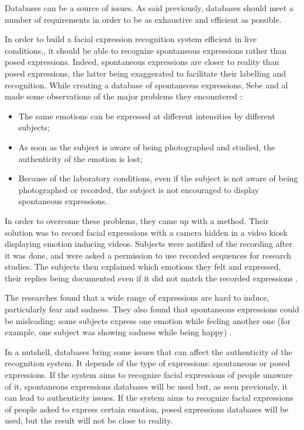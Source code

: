 \vspace{\baselineskip}
\noindent Databases can be a source of issues. As said previously, databases should meet a number of requirements in order to be as exhaustive and efficient as possible. 
\newline

\noindent In order to build a facial expression recognition system efficient in live conditions,, it should be able to recognize spontaneous expressions rather than posed expressions. Indeed, spontaneous expressions are closer to reality than posed expressions, the latter being exaggerated to facilitate their labelling and recognition. While creating a database of spontaneous expressions, Sebe and al \cite{SEB07} made some observations of the major problems they encountered \cite{BET12}:
\newline
\begin{itemize}
  \item The same emotions can be expressed at different intensities by different subjects;
  \item As soon as the subject is aware of being photographed and studied, the authenticity of the emotion is lost;
  \item Because of the laboratory conditions, even if the subject is not aware of being photographed or recorded, the subject is not encouraged to display spontaneous expressions.
\end{itemize}

\vspace{\baselineskip}
\noindent In order to overcome these problems, they came up with a method. Their solution was to record facial expressions with a camera hidden in a video kiosk displaying emotion inducing videos. Subjects were notified of the recording after it was done, and were asked a permission to use recorded sequences for research studies. The subjects then explained which emotions they felt and expressed, their replies being documented even if it did not match the recorded expressions \cite{SEB07}.
\newline

\noindent The researches found that a wide range of expressions are hard to induce, particularly fear and sadness. They also found that spontaneous expressions could be misleading: some subjects express one emotion while feeling another one (for example, one subject was showing sadness while being happy) \cite{SEB07}.
\newline

\noindent In a nutshell, databases bring some issues that can affect the authenticity of the recognition system. It depends of the type of expressions: spontaneous or posed expressions. If the system aims to recognize facial expressions of people unaware of it, spontaneous expressions databases will be used but, as seen previously, it can lead to authenticity issues. If the system aims to recognize facial expressions of people asked to express certain emotion, posed expressions databases will be used, but the result will not be close to reality.
\newline

